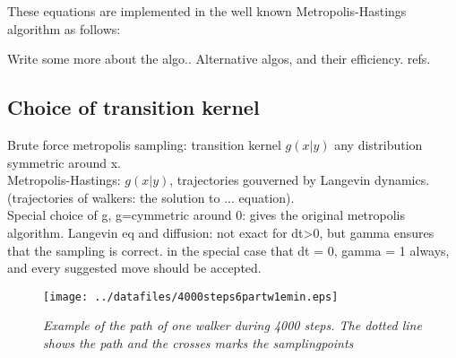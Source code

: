 \documentclass[a4paper,10pt,twocolumn]{article} %
\begin{document}
These equations are implemented in the well known Metropolis-Hastings algorithm as follows:
\begin{algorithmic}
\LOOP{}
\ELSE
{}
\ENDIF{}
\ENDLOOP{}
\end{algorithmic}
Write some more about the algo..
Alternative algos, and their efficiency. refs.


\subsection{Choice of transition kernel} %

Brute force metropolis sampling: transition kernel $g(x|y)$ any distribution symmetric around x.\\
Metropolis-Hastings: $g(x|y)$, trajectories gouverned by Langevin dynamics. (trajectories of walkers: the solution to 
... equation).\\

Special choice of g, g=cymmetric around 0: gives the original metropolis algorithm.
Langevin eq and diffusion: not exact for dt>0, but gamma ensures that the sampling is correct. in the special case that 
dt = 0, gamma = 1 always, and every suggested move should be accepted. 


\begin{figure}[h]
\begin{center}
	\texttt{[image: ../datafiles/4000steps6partw1emin.eps]}
\end{center}
\caption{{\it\small Example of the path of one walker during 4000 steps. The dotted line shows the path and the crosses 
marks the samplingpoints}}
\end{figure}
\end{document}
